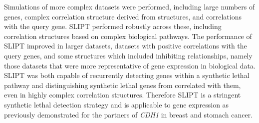 Simulations of more complex datasets were performed, including large numbers of genes, complex correlation structure derived from  structures, and correlations with the query gene. \gls{SLIPT} performed robustly across these, including correlation structures based on complex biological pathways. The performance of \gls{SLIPT} improved in larger datasets, datasets with positive correlations with the query genes, and some  structures which included inhibiting relationships, namely those datasets that were more representative of \gls{gene expression} in biological data. \gls{SLIPT} was both capable of recurrently detecting genes within a \gls{synthetic lethal} pathway and distinguishing \gls{synthetic lethal} genes from correlated with them, even in highly complex correlation structures. Therefore \gls{SLIPT} is a stringent \gls{synthetic lethal} detection strategy and is applicable to \gls{gene expression} as previously demonstrated for the partners of \textit{CDH1} in breast and stomach cancer. %

\clearpage

\iffalse
\paragraph{Aims}

  \begin{itemize}
   \item A Model of Synthetic Lethal Genes in Gene Expression Data
   
   \bigskip
   
   \item Comparison of SLIPT to Alternative Approaches
   
   \bigskip
   
   \item Simulations of Known Synthetic Lethal Genes within Pathway Networks
      
  \end{itemize}

\paragraph{Summary}

    \begin{itemize}
      \item I have designed a straight-forward rational query-based \gls{synthetic lethal} detection method with the example of application to \textit{CDH1} in cancer \gls{gene expression}
      
      \bigskip
      
      \item I have developed a simulation pipeline to generate continuous \gls{gene expression} with \glslink{graph}{pathway} structure including a procedure to simulate \glspl{synthetic lethal} 
      
      \bigskip
      
      \item The simulation procedure shows that SLIPT is robust across \glslink{graph}{pathway} structures and has desirable performance compared to other statistical techniques 
      \end{itemize}
\fi